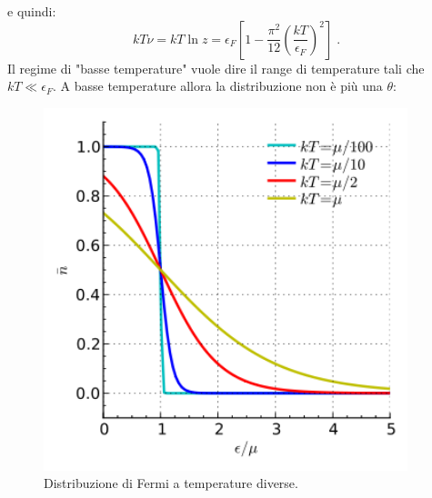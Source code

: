 \documentclass[10pt,a4paper]{report}
\theoremstyle{definition}
\numberwithin{equation}{section}
\begin{document}
e quindi:
$$
kT\nu=kT\ln z=\epsilon_F\left[1-\frac{\pi^2}{12}\left(\frac{kT}{\epsilon_F}\right)^2\right]\;.
$$
Il regime di "basse temperature" vuole dire il range di temperature tali che $kT\ll \epsilon_F$. A basse temperature allora la distribuzione non è più una $\theta$:
\begin{figure}[h]
\centering
\includegraphics[width=300pt,keepaspectratio=true]{Addons/fermilowtemperature}
\caption{\footnotesize{Distribuzione di Fermi a temperature diverse.}}

\end{figure}
\end{document}
